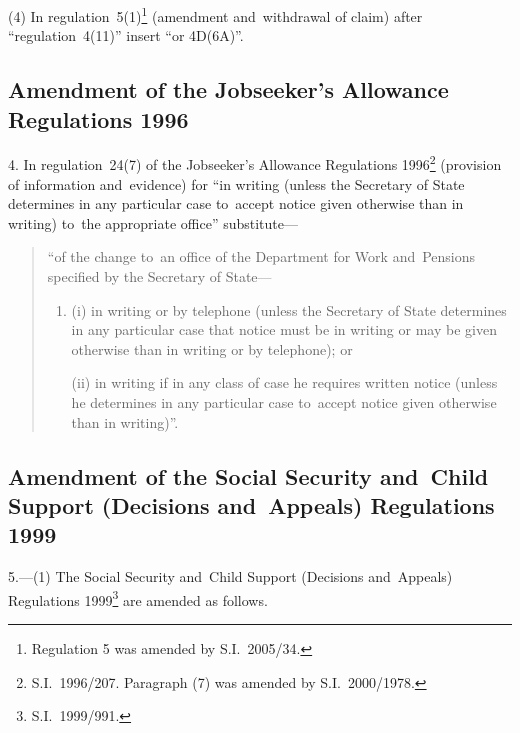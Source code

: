 \documentclass[12pt,a4paper]{article}
\begin{document}
(4) In regulation~5(1)\footnote{Regulation 5 was amended by S.I.~2005/34.} (amendment and~withdrawal of claim) after “regulation~4(11)” insert “or 4D(6A)”.

\subsection[4. Amendment of the Jobseeker’s Allowance Regulations 1996]{Amendment of the Jobseeker’s Allowance Regulations 1996}

4.  In regulation~24(7) of the Jobseeker’s Allowance Regulations 1996\footnote{S.I.~1996/207. Paragraph (7) was amended by S.I.~2000/1978.} (provision of information and~evidence) for “in writing (unless the Secretary of State determines in any particular case to~accept notice given otherwise than in writing) to~the appropriate office” substitute—
\begin{quotation}
    “of the change to~an office of the Department for Work and~Pensions specified by the Secretary of State—
\begin{enumerate}\item[]
    (i) 
    in writing or by telephone (unless the Secretary of State determines in any particular case that notice must be in writing or may be given otherwise than in writing or by telephone); or

    (ii) 
    in writing if in any class of case he requires written notice (unless he determines in any particular case to~accept notice given otherwise than in writing)”. 
\end{enumerate}
\end{quotation}

\subsection[5. Amendment of the Social Security and~Child Support (Decisions and~Appeals) Regulations 1999]{Amendment of the Social Security and~Child Support (Decisions and~Appeals) Regulations 1999}

5.---(1)  The Social Security and~Child Support (Decisions and~Appeals) Regulations 1999\footnote{S.I.~1999/991.} are amended as follows.
\end{document}
